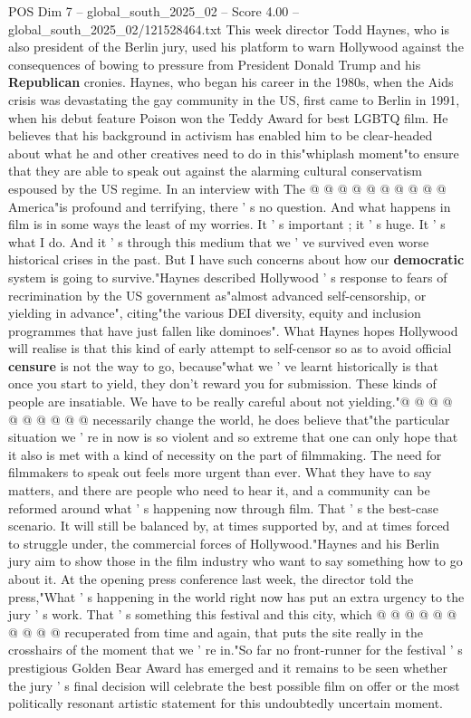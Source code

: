 \begin{textsample}{POS Dim 7 – global\_south\_2025\_02 – Score 4.00 – global\_south\_2025\_02/121528464.txt}
This week director Todd Haynes, who is also president of the Berlin jury, used his platform to warn Hollywood against the consequences of bowing to pressure from President Donald Trump and his \textbf{Republican} cronies.
Haynes, who began his career in the 1980s, when the Aids crisis was devastating the gay community in the US, first came to Berlin in 1991, when his debut feature Poison won the Teddy Award for best LGBTQ film.
He believes that his background in activism has enabled him to be clear-headed about what he and other creatives need to do in this"whiplash moment"to ensure that they are able to speak out against the alarming cultural conservatism espoused by the US regime.
In an interview with The @ @ @ @ @ @ @ @ @ @ America"is profound and terrifying, there ' s no question.
And what happens in film is in some ways the least of my worries.
It ' s important ; it ' s huge.
It ' s what I do.
And it ' s through this medium that we ' ve survived even worse historical crises in the past.
But I have such concerns about how our \textbf{democratic} system is going to survive."Haynes described Hollywood ' s response to fears of recrimination by the US government as"almost advanced self-censorship, or yielding in advance", citing"the various DEI diversity, equity and inclusion programmes that have just fallen like dominoes".
What Haynes hopes Hollywood will realise is that this kind of early attempt to self-censor so as to avoid official \textbf{censure} is not the way to go, because"what we ' ve learnt historically is that once you start to yield, they don't reward you for submission.
These kinds of people are insatiable.
We have to be really careful about not yielding."@ @ @ @ @ @ @ @ @ @ necessarily change the world, he does believe that"the particular situation we ' re in now is so violent and so extreme that one can only hope that it also is met with a kind of necessity on the part of filmmaking.
The need for filmmakers to speak out feels more urgent than ever.
What they have to say matters, and there are people who need to hear it, and a community can be reformed around what ' s happening now through film.
That ' s the best-case scenario.
It will still be balanced by, at times supported by, and at times forced to struggle under, the commercial forces of Hollywood."Haynes and his Berlin jury aim to show those in the film industry who want to say something how to go about it.
At the opening press conference last week, the director told the press,"What ' s happening in the world right now has put an extra urgency to the jury ' s work.
That ' s something this festival and this city, which @ @ @ @ @ @ @ @ @ @ recuperated from time and again, that puts the site really in the crosshairs of the moment that we ' re in."So far no front-runner for the festival ' s prestigious Golden Bear Award has emerged and it remains to be seen whether the jury ' s final decision will celebrate the best possible film on offer or the most politically resonant artistic statement for this undoubtedly uncertain moment.

\end{textsample}
